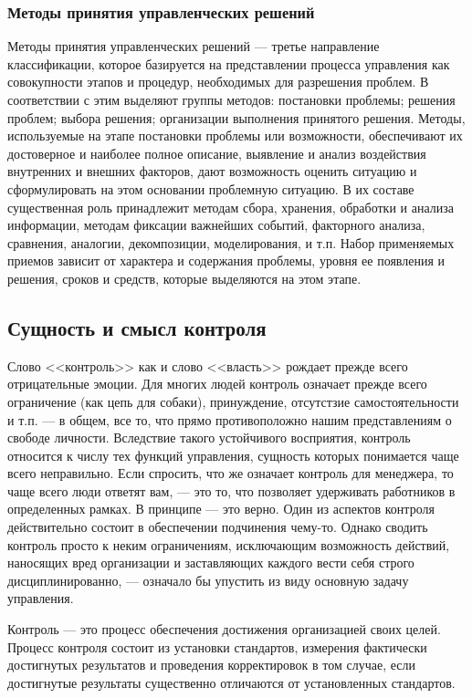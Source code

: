 \documentclass[a4paper,12pt,oneside,final]{extarticle}
\numberwithin{equation}{section}
\begin{document}
\subsubsection{Методы принятия управленческих решений}
Методы принятия управленческих решений --- третье направление классификации, которое базируется на представлении процесса управления как совокупности этапов и процедур, необходимых для разрешения проблем. 
В соответствии с этим выделяют группы методов: постановки проблемы; решения проблем; выбора решения; организации выполнения принятого решения.
Методы, используемые на этапе постановки проблемы или воз­можности, обеспечивают их достоверное и наиболее полное описание, выявление и анализ воздействия внутренних и внешних факторов, дают возможность оценить ситуацию и сформулировать на этом основании проблемную ситуацию. 
В их составе существенная роль принадлежит методам сбора, хранения, обработки и анализа информации, методам фиксации важнейших событий, факторного анализа, сравнения, аналогии, декомпозиции, моделирования, и т.п. 
Набор применяемых приемов зависит от характера и содержания проблемы, уровня ее появления и решения, сроков и средств, которые выделяются на этом этапе.

\subsection{Сущность и смысл контроля}
Слово <<контроль>> как и слово <<власть>> рождает прежде всего отрицательные эмоции. 
Для многих людей контроль означает прежде всего ограничение (как цепь для собаки), принуждение, отсутстзие самостоятельности и т.п. --- в общем, все то, что прямо противоположно нашим представлениям о свободе личности. 
Вследствие такого устойчивого восприятия, контроль относится к числу тех функций управления, сущность которых понимается чаще всего неправильно. 
Если спросить, что же означает контроль для менеджера, то чаще всего люди ответят вам, --- это то, что позволяет удерживать работников в определенных рамках. 
В принципе --- это верно. 
Один из аспектов контроля действительно состоит в обеспечении подчинения чему-то. 
Однако сводить контроль просто к неким ограничениям, исключающим возможность действий, наносящих вред организации и заставляющих каждого вести себя строго дисциплинированно, --- означало бы упустить из виду основную задачу управления.

Контроль --- это процесс обеспечения достижения организацией своих целей.
Процесс контроля состоит из установки стандартов, измерения фактически достигнутых результатов и проведения корректировок в том случае, если достигнутые результаты существенно отличаются от установленных стандартов.
\end{document}
